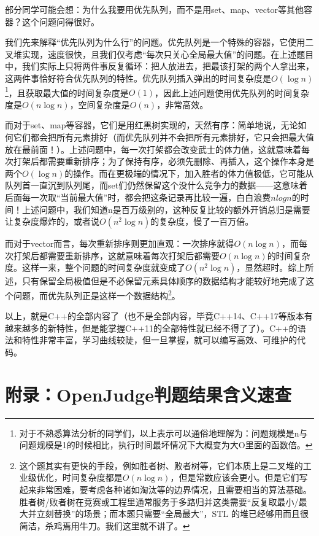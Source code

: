 \documentclass[../main.tex]{subfiles}
\begin{document}
\begin{note}
  部分同学可能会想：为什么我要用优先队列，而不是用set、map、vector等其他容器？这个问题问得很好。

  我们先来解释“优先队列为什么行”的问题。优先队列是一个特殊的容器，它使用二叉堆实现，速度很快，且我们仅考虑“每次只关心全局最大值”的问题。在上述题目中，我们实际上只将两件事反复循环：把人放进去，把最该打架的两个人拿出来，这两件事恰好符合优先队列的特性。优先队列插入弹出的时间复杂度是$O(\log n)$\footnote{对于不熟悉算法分析的同学们，以上表示可以通俗地理解为：问题规模是n与问题规模是1的时候相比，执行时间最坏情况下大概变为大O里面的函数倍。}，且获取最大值的时间复杂度是$O(1)$，因此上述问题使用优先队列的时间复杂度是$O(n \log n)$，空间复杂度是$O(n)$，非常高效。

  而对于set、map等容器，它们是用红黑树实现的，天然有序：简单地说，无论如何它们都会把所有元素排好（而优先队列并不会把所有元素排好，它只会把最大值放在最前面！）。上述问题中，每一次打架都会改变武士的体力值，这就意味着每次打架后都需要重新排序；为了保持有序，必须先删除、再插入，这个操作本身是两个$O(\log n)$的操作。而在更极端的情况下，加入胜者的体力值极低，它可能从队列首一直沉到队列尾，而set们仍然保留这个没什么竞争力的数据——这意味着后面每一次取“当前最大值”时，都会把这条记录再比较一遍，白白浪费$n log n $的时间！上述问题中，我们知道n是百万级别的，这种反复比较的额外开销总归是需要让复杂度爆炸的，或者说$O(n^2 \log n)$的复杂度，慢了一百万倍。

  而对于vector而言，每次重新排序则更加直观：一次排序就得$O(n \log n)$，而每次打架后都需要重新排序，这就意味着每次打架后都需要$O(n \log n)$的时间复杂度。这样一来，整个问题的时间复杂度就变成了$O(n^2 \log n)$，显然超时。综上所述，只有保留全局极值但是不必保留元素具体顺序的数据结构才能较好地完成了这个问题，而优先队列正是这样一个数据结构\footnote{这个题其实有更快的手段，例如胜者树、败者树等，它们本质上是二叉堆的工业级优化，时间复杂度都是$O(n \log n)$，但是常数应该会更小。但是它们写起来非常困难，要考虑各种诸如淘汰等的边界情况，且需要相当的算法基础。胜者树/败者树在竞赛或工程里通常服务于多路归并这类需要“反复取最小/最大并立刻替换”的场景；而本题只需要“全局最大”，STL 的堆已经够用而且很简洁，杀鸡焉用牛刀。我们这里就不讲了。}。
\end{note}

以上，就是C++的全部内容了（也不是全部内容，毕竟C++14、C++17等版本有越来越多的新特性，但是能掌握C++11的全部特性就已经不得了了）。C++的语法和特性非常丰富，学习曲线较陡，但一旦掌握，就可以编写高效、可维护的代码。

\section{附录：OpenJudge判题结果含义速查}
\end{document}
